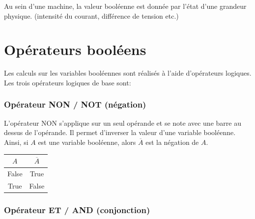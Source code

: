 Au sein d'une machine, la valeur booléenne est donnée par l'état d'une grandeur physique. (intensité du courant, différence de tension etc.)

\section{Opérateurs booléens}

Les calculs sur les variables booléennes sont réalisés à l'aide d'opérateurs logiques. Les trois opérateurs logiques de base sont:

\subsubsection*{Opérateur NON / NOT (négation)}

\begin{minipage}{0.80\linewidth}
	L'opérateur NON s'applique sur un seul opérande et se note avec une barre au dessus de l'opérande. Il permet d'inverser la valeur d'une variable booléenne. Ainsi, si $A$ est une variable booléenne, alors $\overline{A}$ est la négation de $A$.
\end{minipage}\hfill{}
\begin{minipage}{0.18\linewidth}
	\begin{flushright}
		\renewcommand{\arraystretch}{1.2}
	\begin{tabular}{cc}
		\hline
		$A$ & $\overline{A}$ \\
		\hline
		False & True \\
		True & False \\
		\hline
		
	\end{tabular}
	\end{flushright}
	
\end{minipage}

\subsubsection*{Opérateur ET / AND (conjonction)}

